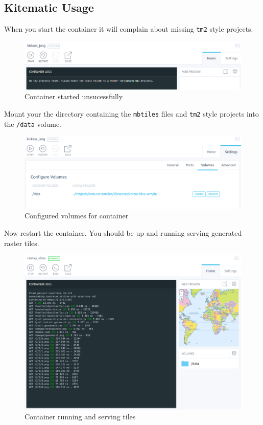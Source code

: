 \subsection*{Kitematic Usage}\label{kitematic-usage}

When you start the container it will complain about missing
\texttt{tm2} style projects.

\begin{figure}[H]
\centering
\includegraphics[width=1\textwidth]{images/tileserver_kitematic_started.png}
\caption[]{Container started unsucessfully}
\end{figure}

Mount your the directory containing the \texttt{mbtiles} files and
\texttt{tm2} style projects into the \texttt{/data} volume.

\begin{figure}[H]
\centering
\includegraphics[width=1\textwidth]{images/tileserver_kitematic_volumes_configured.png}
\caption[]{Configured volumes for container}
\end{figure}

Now restart the container. You should be up and running serving
generated raster tiles.

\begin{figure}[H]
\centering
\includegraphics[width=1\textwidth]{images/tileserver_kitematic_running.png}
\caption[]{Container running and serving tiles}
\end{figure}

